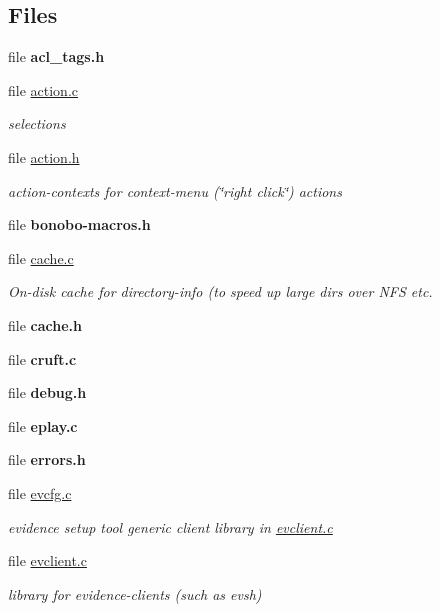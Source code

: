 \subsection*{Files}
\begin{CompactItemize}
\item 
file {\bf acl\_\-tags.h}
\item 
file \hyperlink{action_8c}{action.c}
\begin{CompactList}\small\item\em selections \item\end{CompactList}

\item 
file \hyperlink{action_8h}{action.h}
\begin{CompactList}\small\item\em action-contexts for context-menu (\char`\"{}right click\char`\"{}) actions \item\end{CompactList}

\item 
file {\bf bonobo-macros.h}
\item 
file \hyperlink{cache_8c}{cache.c}
\begin{CompactList}\small\item\em On-disk cache for directory-info (to speed up large dirs over NFS etc. \item\end{CompactList}

\item 
file {\bf cache.h}
\item 
file {\bf cruft.c}
\item 
file {\bf debug.h}
\item 
file {\bf eplay.c}
\item 
file {\bf errors.h}
\item 
file \hyperlink{evcfg_8c}{evcfg.c}
\begin{CompactList}\small\item\em evidence setup tool generic client library in \hyperlink{evclient_8c}{evclient.c} \item\end{CompactList}

\item 
file \hyperlink{evclient_8c}{evclient.c}
\begin{CompactList}\small\item\em library for evidence-clients (such as evsh) \item\end{CompactList}


\end{CompactItemize}
